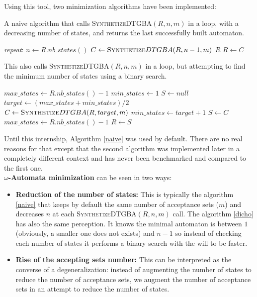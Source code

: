 \noindent Using this tool, two minimization algorithms have been implemented:
\begin{algorithm}[H]
 \caption{A naive algorithm that calls \textsc{Synthetize}DTGBA$(R,n,m)$ in a loop, with a decreasing
          number of states, and returns the last successfully built automaton.}
 \label{naive}
 \begin{algorithmic}[1]
   \BState \emph{repeat}:
   \State $n \gets R.nb\_states() $
   \State $C \gets \textsc{Synthetize}DTGBA(R,n-1,m) $
    \Return $R$\EndIf
   \State $R \gets C$
  \EndProcedure
 \end{algorithmic}
\end{algorithm}

\begin{algorithm}[H]
 \caption{This also calls \textsc{Synthetize}DTGBA$(R,n,m)$ in a loop, but attempting to find the minimum
          number of states using a binary search.}
 \label{dicho}
 \begin{algorithmic}[1]
   \State $max\_states \gets R.nb\_states()-1$
   \State $min\_states \gets 1$
   \State $S \gets null$
    \State $target \gets (max\_states + min\_states) / 2$
    \State $C \gets \textsc{Synthetize}DTGBA(R,target,m)$
     \State $min\_states \gets target + 1$
    \Else
     \State $S \gets C$
     \State $max\_states \gets R.nb\_states()-1$
    \EndIf
   \EndWhile
   \State $R \gets S$
  \EndProcedure
 \end{algorithmic}
\end{algorithm}

\noindent Until this internship, Algorithm \ref{naive} was used by default. There are no real reasons for
that except that the second algorithm was implemented later in a completely different context and has never
been benchmarked and compared to the first one.\\

\noindent \textbf{$\omega$-Automata minimization} can be seen in two ways:
\begin{itemize}
 \item \textbf{Reduction of the number of states:}
       This is typically the algorithm \ref{naive} that keeps by default the same number of acceptance sets
       ($m$) and decreases $n$ at each \textsc{Synthetize}DTGBA$(R,n,m)$ call. The algorithm \ref{dicho}
       has also the same perception. It knows the minimal automaton is between $1$ (obviously, a smaller
       one does not exists) and $n-1$ so instead of checking each number of states it performs a binary
       search with the will to be faster.
 \item \textbf{Rise of the accepting sets number:}
       This can be interpreted as the converse of a degeneralization: instead of augmenting the number
       of states to reduce the number of acceptance sets, we augment the number of acceptance sets in
       an attempt to reduce the number of states.
\end{itemize}

